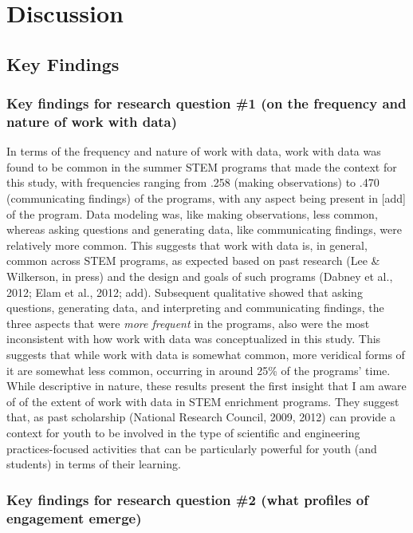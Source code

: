 \documentclass[]{msu-thesis}
\theoremstyle{definition}
\theoremstyle{definition}
\theoremstyle{definition}
\theoremstyle{remark}
\begin{document}
\chapter{Discussion}\label{discussion}

\section{Key Findings}\label{key-findings}

\subsection{Key findings for research question \#1 (on the frequency and
nature of work with
data)}\label{key-findings-for-research-question-1-on-the-frequency-and-nature-of-work-with-data}

In terms of the frequency and nature of work with data, work with data
was found to be common in the summer STEM programs that made the context
for this study, with frequencies ranging from .258 (making observations)
to .470 (communicating findings) of the programs, with any aspect being
present in {[}add{]} of the program. Data modeling was, like making
observations, less common, whereas asking questions and generating data,
like communicating findings, were relatively more common. This suggests
that work with data is, in general, common across STEM programs, as
expected based on past research (Lee \& Wilkerson, in press) and the
design and goals of such programs (Dabney et al., 2012; Elam et al.,
2012; add). Subsequent qualitative showed that asking questions,
generating data, and interpreting and communicating findings, the three
aspects that were \emph{more frequent} in the programs, also were the
most inconsistent with how work with data was conceptualized in this
study. This suggests that while work with data is somewhat common, more
veridical forms of it are somewhat less common, occurring in around 25\%
of the programs' time. While descriptive in nature, these results
present the first insight that I am aware of of the extent of work with
data in STEM enrichment programs. They suggest that, as past scholarship
(National Research Council, 2009, 2012) can provide a context for youth
to be involved in the type of scientific and engineering
practices-focused activities that can be particularly powerful for youth
(and students) in terms of their learning.

\subsection{Key findings for research question \#2 (what profiles of
engagement
emerge)}\label{key-findings-for-research-question-2-what-profiles-of-engagement-emerge}
\end{document}
